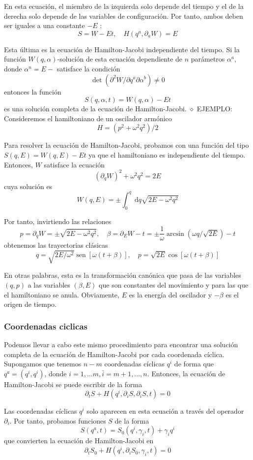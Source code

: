En esta ecuación, el miembro de la izquierda solo depende del tiempo y el de la derecha solo depende de las variables de configuración. Por tanto, ambos deben ser iguales a una constante $-E$ :
$$
S=W-E t, \quad H\left(q^{a}, \partial_{a} W\right)=E
$$

Esta última es la ecuación de Hamilton-Jacobi independiente del tiempo. Si la función $W(q, \alpha)$-solución de esta ecuación dependiente de $n$ parámetros $\alpha^{a}$, donde $\alpha^{n}=E-$ satisface la condición
$$
\operatorname{det}\left(\partial^{2} W / \partial q^{a} \partial \alpha^{b}\right) \neq 0
$$
entonces la función
$$
S(q, \alpha, t)=W(q, \alpha)-E t
$$
es una solución completa de la ecuación de Hamilton-Jacobi.
$\diamond$ EJEMPLO: Consideremos el hamiltoniano de un oscilador armónico
$$
H=\left(p^{2}+\omega^{2} q^{2}\right) / 2
$$

Para resolver la ecuación de Hamilton-Jacobi, probamos con una función del tipo $S(q, E)=W(q, E)-E t$ ya que el hamiltoniano es independiente del tiempo. Entonces, $W$ satisface la ecuación
$$
\left(\partial_{q} W\right)^{2}+\omega^{2} q^{2}=2 E
$$
cuya solución es
$$
W(q, E)= \pm \int_{0}^{q} \mathrm{~d} q \sqrt{2 E-\omega^{2} q^{2}}
$$

Por tanto, invirtiendo las relaciones
$$
p=\partial_{q} W= \pm \sqrt{2 E-\omega^{2} q^{2}}, \quad \beta=\partial_{E} W-t= \pm \frac{1}{\omega} \arcsin (\omega q / \sqrt{2 E})-t
$$
obtenemos las trayectorias clásicas
$$
q=\sqrt{2 E / \omega^{2}} \operatorname{sen}[\omega(t+\beta)], \quad p=\sqrt{2 E} \cos [\omega(t+\beta)]
$$

En otras palabras, esta es la transformación canónica que pasa de las variables $(q, p)$ a las variables $(\beta, E)$ que son constantes del movimiento y para las que el hamiltoniano se anula. Obviamente, $E$ es la energía del oscilador y $-\beta$ es el origen de tiempo.
\subsubsection{Coordenadas ciclicas}
Podemos llevar a cabo este mismo procedimiento para encontrar una solución completa de la ecuación de Hamilton-Jacobi por cada coordenada cíclica. Supongamos que tenemos $n-m$ coordenadas cíclicas $q^{i}$ de forma que $q^{a}=\left(q^{i}, q^{i}\right)$, donde $i=1, \ldots m, \bar{i}=m+1, \ldots, n$. Entonces, la ecuación de Hamilton-Jacobi se puede escribir de la forma
$$
\partial_{t} S+H\left(q^{i}, \partial_{i} S, \partial_{i} S, t\right)=0
$$

Las coordenadas cíclicas $q^{i}$ solo aparecen en esta ecuación a través del operador $\partial_{i}$. Por tanto, probamos funciones $S$ de la forma
$$
S\left(q^{a}, t\right)=S_{0}\left(q^{i}, \gamma_{i}, t\right)+\gamma_{i} q^{i}
$$
que convierten la ecuación de Hamilton-Jacobi en
$$
\partial_{t} S_{0}+H\left(q^{i}, \partial_{i} S_{0}, \gamma_{i}, t\right)=0
$$

